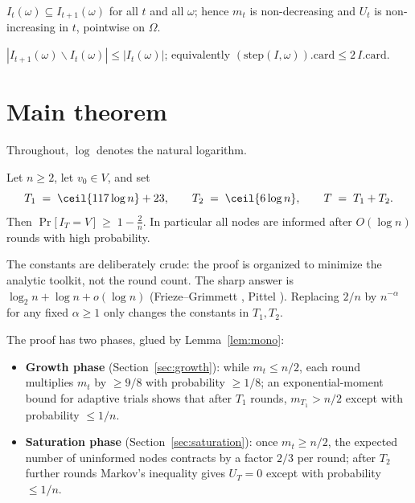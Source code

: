 \begin{lemma}[Monotonicity]\label{lem:mono}
  \leanok
  $I_t(\omega) \subseteq I_{t+1}(\omega)$ for all $t$ and all $\omega$;
  hence $m_t$ is non-decreasing and $U_t$ is non-increasing in $t$,
  pointwise on $\Omega$.
\end{lemma}

\begin{lemma}\label{lem:atmost}
  \leanok
  $|I_{t+1}(\omega) \smallsetminus I_t(\omega)| \le |I_t(\omega)|$; equivalently
  $(\mathrm{step}(I,\omega)).\mathrm{card} \le 2\,I.\mathrm{card}$.
\end{lemma}

\section{Main theorem}\label{sec:main-statement}

Throughout, $\log$ denotes the natural logarithm.

\begin{theorem}
  \label{thm:main}
  \leanok
  Let $n \ge 2$, let $v_0 \in V$, and set
  \[
    T_1 \;=\; \ceil{117 \log n} + 23, \qquad
    T_2 \;=\; \ceil{6 \log n}, \qquad
    T \;=\; T_1 + T_2 .
  \]
  Then $\Pr\bigl[\, I_T = V \,\bigr] \;\ge\; 1 - \frac{2}{n}$.
  In particular all nodes are informed after $O(\log n)$ rounds with high
  probability.
\end{theorem}

\begin{remark}
  The constants are deliberately crude: the proof is organized to minimize
  the analytic toolkit, not the round count. The sharp answer is
  $\log_2 n + \log n + o(\log n)$ (Frieze--Grimmett \cite{FG85}, Pittel
  \cite{Pittel87}). Replacing $2/n$ by $n^{-\alpha}$ for any fixed
  $\alpha \ge 1$ only changes the constants in $T_1, T_2$.
\end{remark}

The proof has two phases, glued by Lemma~\ref{lem:mono}:
\begin{itemize}
\item \textbf{Growth phase} (Section~\ref{sec:growth}): while $m_t \le n/2$,
  each round multiplies $m_t$ by $\ge 9/8$ with probability $\ge 1/8$;
  an exponential-moment bound for adaptive trials shows that after $T_1$
  rounds, $m_{T_1} > n/2$ except with probability $\le 1/n$.
\item \textbf{Saturation phase} (Section~\ref{sec:saturation}): once
  $m_t \ge n/2$, the expected number of uninformed nodes contracts by a
  factor $2/3$ per round; after $T_2$ further rounds Markov's inequality
  gives $U_T = 0$ except with probability $\le 1/n$.
\end{itemize}

